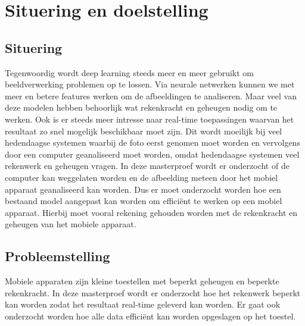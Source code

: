 
\chapter{Situering en doelstelling}

\section{Situering}
Tegenwoordig wordt deep learning steeds meer en meer gebruikt om beeldverwerking problemen op te lossen. Via neurale netwerken kunnen we met meer en betere features werken om de afbeeldingen te analiseren. Maar veel van deze modelen hebben behoorlijk wat rekenkracht en geheugen nodig om te werken. Ook is er steeds meer intresse naar real-time toepassingen waarvan het resultaat zo snel mogelijk beschikbaar moet zijn. Dit wordt moeilijk bij veel hedendaagse systemen waarbij de foto eerst genomen moet worden en vervolgens door een computer geanaliseerd moet worden, omdat hedendaagse systemen veel rekenwerk en geheugen vragen. In deze masterproef wordt er onderzocht of de computer kan weggelaten worden en de afbeelding meteen door het mobiel apparaat geanaliseerd kan worden. Dus er moet onderzocht worden hoe een bestaand model aangepast kan worden om effici\"ent te werken op een mobiel apparaat. Hierbij moet vooral rekening gehouden worden met de rekenkracht en geheugen van het mobiele apparaat.

\section{Probleemstelling}
Mobiele apparaten zijn kleine toestellen met beperkt geheugen en beperkte rekenkracht. In deze masterproef wordt er onderzocht hoe het rekenwerk beperkt kan worden zodat het resultaat real-time geleverd kan worden. Er gaat ook onderzocht worden hoe alle data effici\"ent kan worden opgeslagen op het toestel. 

